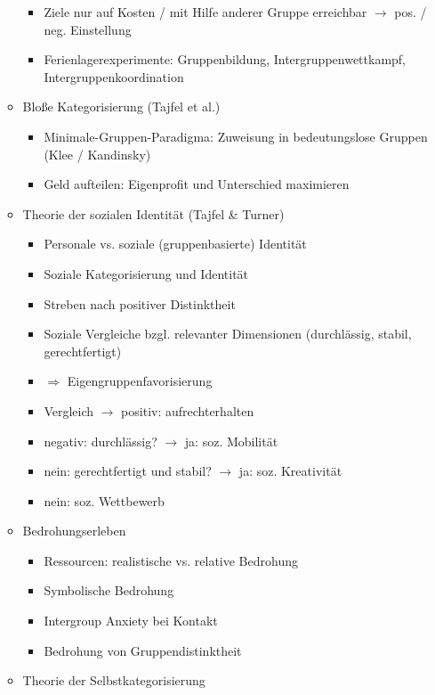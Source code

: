 \documentclass[11pt, paper=a4, twocolumn]{scrartcl}
\begin{document}
\begin{itemize}
\begin{itemize}
\begin{itemize}
							\item Ziele nur auf Kosten / mit Hilfe anderer Gruppe erreichbar $\rightarrow$ pos. / neg. 
								Einstellung
							\item Ferienlagerexperimente: Gruppenbildung, Intergruppenwettkampf, Intergruppenkoordination
						\end{itemize}
					\item Bloße Kategorisierung (Tajfel et al.)
						\begin{itemize}
							\item Minimale-Gruppen-Paradigma: Zuweisung in bedeutungslose Gruppen (Klee / Kandinsky)
							\item Geld aufteilen: Eigenprofit und Unterschied maximieren
						\end{itemize}
					\item Theorie der sozialen Identität (Tajfel \& Turner)
						\begin{itemize}
							\item Personale vs. soziale (gruppenbasierte) Identität
							\item Soziale Kategorisierung und Identität
							\item Streben nach positiver Distinktheit
							\item Soziale Vergleiche bzgl. relevanter Dimensionen (durchlässig, stabil, gerechtfertigt)
							\item $\Rightarrow$ Eigengruppenfavorisierung
							\item Vergleich $\rightarrow$ positiv: aufrechterhalten
							\item negativ: durchlässig? $\rightarrow$ ja: soz. Mobilität
							\item nein: gerechtfertigt und stabil? $\rightarrow$ ja: soz. Kreativität
							\item nein: soz. Wettbewerb
						\end{itemize}
					\item Bedrohungserleben
						\begin{itemize}
							\item Ressourcen: realistische vs. relative Bedrohung
							\item Symbolische Bedrohung
							\item Intergroup Anxiety bei Kontakt
							\item Bedrohung von Gruppendistinktheit
						\end{itemize}
					\item Theorie der Selbstkategorisierung
						\begin{itemize}

\end{itemize}
\end{itemize}
\end{itemize}
\end{document}

